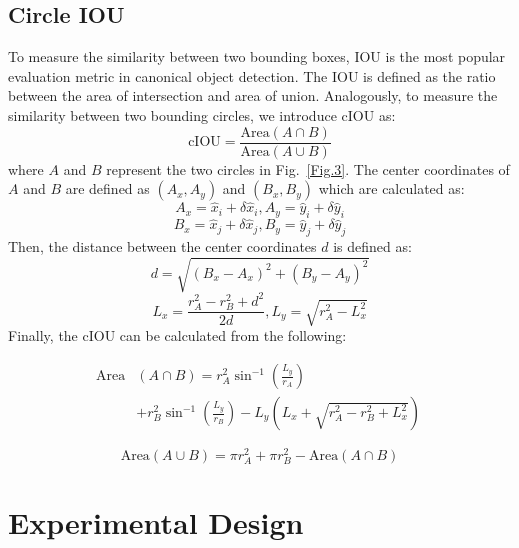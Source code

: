 \documentclass[journal]{IEEEtran}
\newcommand{\Fig}{Fig.}
\begin{document}
\subsection{Circle IOU}
To measure the similarity between two bounding boxes, \ac{IOU} is the most popular evaluation metric in canonical object detection. The \ac{IOU} is defined as the ratio between the area of intersection and area of union. Analogously, to measure the similarity between two bounding circles, we introduce \ac{cIOU} as:
\begin{equation}
\textrm{cIOU} = \frac{\textrm{Area} \left( A \cap B \right)}{\textrm{Area} \left( A \cup B \right)}
\end{equation}
where $A$ and $B$ represent the two circles in \Fig~\ref{Fig.3}. The center coordinates of $A$ and $B$ are defined as $(A_x, A_y)$ and $(B_x, B_y)$ which are calculated as:
\begin{equation}
A_x = \hat x_i + \delta \hat x_i, A_y = \hat y_i + \delta \hat y_i
\end{equation}
\begin{equation}
B_x = \hat x_j + \delta \hat x_j, B_y = \hat y_j + \delta \hat y_j
\end{equation}
Then, the distance between the center coordinates $d$ is  defined as:
\begin{equation}
d = \sqrt{\left( B_x - A_x \right)^{2} + \left( B_y - A_y \right)^{2}}
\end{equation}
\begin{equation}
L_x = \frac{r_A^2 - r_B^2+d^2}{2d}, L_y = \sqrt{r_A^2 - L_x^2}
\end{equation}
Finally, the cIOU can be calculated from the following:

\begin{equation}
\begin{aligned}
\textrm{Area} & \left( A \cap B \right) = r_A^2\sin^{-1}\left( \frac{L_y}{r_A} \right) \\
& + r_B^2\sin^{-1}\left( \frac{L_y}{r_B} \right) - L_y\left(L_x + \sqrt{r_A^2 - r_B^2 +L_x^2}  \right) \   
\end{aligned}
\end{equation}

\begin{equation}
\textrm{Area} \left( A \cup B \right) = \pi r_A^2 + \pi r_B^2 - \textrm{Area} \left( A \cap B \right) 
\end{equation}

\section{Experimental Design}
\end{document}
